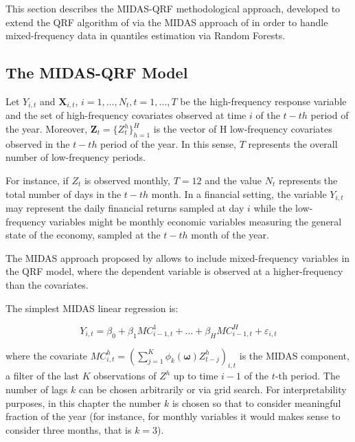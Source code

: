 This section describes the MIDAS-QRF methodological approach, developed to extend the QRF algorithm of \cite{meinshausen2006quantile} via the MIDAS approach of \cite{ghysels2007midas} in order to handle mixed-frequency data in quantiles estimation via Random Forests. %

\subsection{The MIDAS-QRF Model}
Let $Y_{i,t}$ and $\mathbf{X}_{i,t}$, $i=1, \dots, N_t, t=1, \dots, T$ be the high-frequency response variable and the set of high-frequency covariates observed at time $i$ of the $t-th$ period of the year. Moreover, $\textbf{Z}_t=\{Z_t^h\}^{H}_{h=1}$ is the vector of H low-frequency covariates observed in the $t-th$ period of the year. In this sense, $T$ represents the overall number of low-frequency periods. 

\vspace{0.15in}

\noindent For instance, if $Z_t$ is observed monthly, $T=12$ and the value $N_t$ represents the total number of days in the $t-th$ month. In a financial setting, the variable $Y_{i,t}$ may represent the daily financial returns sampled at day $i$ while the low-frequency variables might be monthly economic variables measuring the general state of the economy, sampled at the $t-th$ month of the year.
\vspace{0.15in}

\noindent The MIDAS approach proposed by \cite{ghysels2007midas} allows to include mixed-frequency variables in the QRF model, where the dependent variable is observed at a higher-frequency than the covariates.
\vspace{0.15in}

\noindent The simplest MIDAS linear regression is:

\begin{equation}
	\label{eq:MIDAS}
	Y_{i,t}=\beta_0+\beta_1MC_{i-1,t}^1+\dots+\beta_H MC_{i-1,t}^H+ \varepsilon_{i,t}
\end{equation}

where the covariate $MC_{i,t}^h=(\sum_{j=1}^{K}\phi_k(\bm{\omega})Z_{t-j}^h)_{i,t}$ is the MIDAS component, a filter of the last $K$ observations of $Z^h$ up to time $i-1$ of the $t$-th period. The number of lags $k$ can be chosen arbitrarily or via grid search. For interpretability purposes, in this chapter the number $k$ is chosen so that to consider meaningful fraction of the year (for instance, for monthly variables it would makes sense to consider three months, that is $k=3$).

